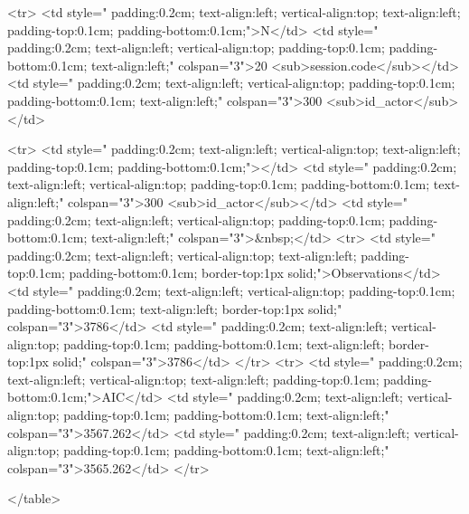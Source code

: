 <tr>
<td style=" padding:0.2cm; text-align:left; vertical-align:top; text-align:left; padding-top:0.1cm; padding-bottom:0.1cm;">N</td>
<td style=" padding:0.2cm; text-align:left; vertical-align:top; padding-top:0.1cm; padding-bottom:0.1cm; text-align:left;" colspan="3">20 <sub>session.code</sub></td>
<td style=" padding:0.2cm; text-align:left; vertical-align:top; padding-top:0.1cm; padding-bottom:0.1cm; text-align:left;" colspan="3">300 <sub>id_actor</sub></td>

<tr>
<td style=" padding:0.2cm; text-align:left; vertical-align:top; text-align:left; padding-top:0.1cm; padding-bottom:0.1cm;"></td>
<td style=" padding:0.2cm; text-align:left; vertical-align:top; padding-top:0.1cm; padding-bottom:0.1cm; text-align:left;" colspan="3">300 <sub>id_actor</sub></td>
<td style=" padding:0.2cm; text-align:left; vertical-align:top; padding-top:0.1cm; padding-bottom:0.1cm; text-align:left;" colspan="3">&nbsp;</td>
<tr>
<td style=" padding:0.2cm; text-align:left; vertical-align:top; text-align:left; padding-top:0.1cm; padding-bottom:0.1cm; border-top:1px solid;">Observations</td>
<td style=" padding:0.2cm; text-align:left; vertical-align:top; padding-top:0.1cm; padding-bottom:0.1cm; text-align:left; border-top:1px solid;" colspan="3">3786</td>
<td style=" padding:0.2cm; text-align:left; vertical-align:top; padding-top:0.1cm; padding-bottom:0.1cm; text-align:left; border-top:1px solid;" colspan="3">3786</td>
</tr>
<tr>
<td style=" padding:0.2cm; text-align:left; vertical-align:top; text-align:left; padding-top:0.1cm; padding-bottom:0.1cm;">AIC</td>
<td style=" padding:0.2cm; text-align:left; vertical-align:top; padding-top:0.1cm; padding-bottom:0.1cm; text-align:left;" colspan="3">3567.262</td>
<td style=" padding:0.2cm; text-align:left; vertical-align:top; padding-top:0.1cm; padding-bottom:0.1cm; text-align:left;" colspan="3">3565.262</td>
</tr>

</table>

